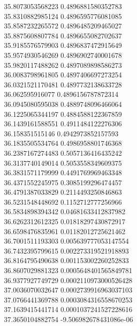 {35.8073053568223 0.4896881580352783
 \\
35.8310882985124 0.4896595776081085
 \\
35.8587232265572 0.4896485209465027
 \\
35.8875608807784 0.4896655082702637
 \\
35.9185576579903 0.4896837472915649
 \\
35.9574930546269 0.4896902740001678
 \\
35.9820117488262 0.4897089898586273
 \\
36.0083798961805 0.4897406697273254
 \\
36.0321521170481 0.4897732138633728
 \\
36.062595916077 0.4896156787872314
 \\
36.0945080595038 0.4889748096466064
 \\
36.1225065344197 0.4884588122367859
 \\
36.1439161588551 0.4911484122276306
 \\
36.158351515146 0.4942973852157593
 \\
36.1835505534764 0.4986958801746368
 \\
36.2387167274483 0.5057136416435242
 \\
36.3137740149014 0.5053558349609375
 \\
36.3831571179999 0.4491769969463348
 \\
36.4371552245975 0.3085199296474457
 \\
36.4791387033829 0.2114493250846863
 \\
36.5231548448692 0.1152712777256966
 \\
36.5834898394342 0.04681633412837982
 \\
36.6262312612325 0.01818297430872917
 \\
36.6598476835961 0.01182012725621462
 \\
36.7001511193303 0.005639777053147554
 \\
36.7432395799615 0.002273319521918893
 \\
36.8164795490638 0.001153002260252833
 \\
36.8607029881323 0.0005648401565849781
 \\
36.9377927749729 0.0002110973000526428
 \\
37.0036070032647 0.0002739916963037103
 \\
37.0766441369788 0.0003084316558670253
 \\
37.1639415441714 0.0001037241527228616
 \\
37.3650104882754 -9.506982678431086e-06
}
